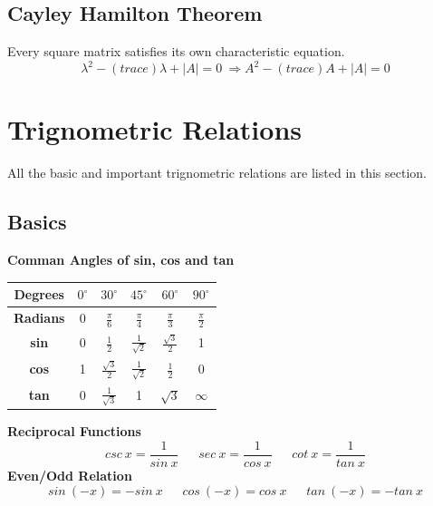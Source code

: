 \subsection*{Cayley Hamilton Theorem}
Every square matrix satisfies its own characteristic equation.
\[\lambda^2-(trace)\lambda+|A|=0\ \Rightarrow A^2-(trace)A+|A|=0\]
\pagebreak

\section{Trignometric Relations}
All the basic and important trignometric relations are listed in this section.

\subsection{Basics}
\textbf{Comman Angles of sin, cos and tan}
\begin{table}[h!]
\centering
\setlength{\tabcolsep}{2em}
\tabulinesep=3.5mm
\begin{tabu}{|c|c|c|c|c|c|}
\hline
\textbf{Degrees} & \textbf{\(0^\circ\)} & \textbf{\(30^\circ\)} & \textbf{\(45^\circ\)} & \textbf{\(60^\circ\)} & \textbf{\(90^\circ\)} \\ \hline
\textbf{Radians} & 0                     & \(\frac{\pi}{6}\)      & \(\frac{\pi}{4}\)      & \(\frac{\pi}{3}\)      & \(\frac{\pi}{2}\)      \\ \hline
\textbf{sin}     & 0                     & \(\frac{1}{2}\)        & \(\frac{1}{\sqrt{2}}\) & \(\frac{\sqrt{3}}{2}\) & 1                      \\ \hline
\textbf{cos}     & 1                     & \(\frac{\sqrt{3}}{2}\) & \(\frac{1}{\sqrt{2}}\) & \(\frac{1}{2}\)        & 0                      \\ \hline
\textbf{tan}     & 0                     & \(\frac{1}{\sqrt{3}}\) & 1                      & \(\sqrt{3}\)           & \(\infty\)             \\ \hline

\end{tabu}
\end{table}
\textbf{Reciprocal Functions}
\[csc\ x=\frac{1}{sin\ x}\ \ \ \ \ \ \ sec\ x=\frac{1}{cos\ x}\ \ \ \ \ \ \ cot\ x=\frac{1}{tan\ x} \]
\textbf{Even/Odd Relation}
\[sin\ (-x)=-sin\ x\ \ \ \ \ \ \ cos\ (-x)=cos\ x\ \ \ \ \ \ \ tan\ (-x)=-tan\ x\]


